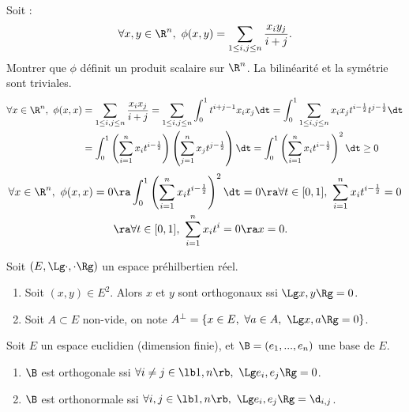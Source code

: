 \documentclass[11pt]{article}
\begin{document}
\begin{ex}{}{}
    Soit :
    \begin{equation*}
        \forall x,y \in \R^n, ~ \phi(x,y) = \sum_{1\leq i,j \leq n}\frac{x_i y_j}{i + j}.
    \end{equation*}
    Montrer que $\phi$ définit un produit scalaire sur $\R^n$.
    \tcblower
    La bilinéarité et la symétrie sont triviales.
    \begin{align*}
        \forall x \in \R^n, ~ \phi(x,x) &= \sum_{1\leq i,j \leq n}\frac{x_ix_j}{i+j}= \sum_{1\leq i,j \leq n} \int_0^1t^{i+j-1}x_ix_j\dt=\int_0^1 \sum_{1\leq i,j \leq n} x_i x_j t^{i-\frac{1}{2}}t^{j-\frac{1}{2}}\dt\\
        &=\int_0^1\left( \sum_{i=1}^n x_it^{i-\frac{1}{2}} \right)\left( \sum_{j=1}^nx_j t^{j-\frac{1}{2}} \right)\dt = \int_0^1 \left( \sum_{i=1}^n x_i t^{i-\frac{1}{2}} \right)^2\dt \geq 0
    \end{align*}
    \begin{align*}
        \forall x \in \R^n, ~ \phi(x,x) = 0 &\ra \int_0^1\left( \sum_{i=1}^n x_it^{i-\frac{1}{2}} \right)^2\dt=0 \ra \forall t \in [0,1], ~ \sum_{i=1}^n x_i t^{i-\frac{1}{2}}=0\\
    &\ra \forall t \in [0,1], ~ \sum_{i=1}^n x_it^i = 0 \ra x=0.
    \end{align*}
\end{ex}

\begin{defi}{}{}
    Soit $(E,\Lg \cdot, \cdot \Rg)$ un espace préhilbertien réel.
    \begin{enumerate}
        \item Soit $(x,y) \in E^2$. Alors $x$ et $y$ sont orthogonaux ssi $\Lg x,y \Rg = 0$.
        \item Soit $A\subset E$ non-vide, on note $A^\bot = \{x \in E, ~ \forall a \in A, ~ \Lg x, a \Rg = 0\}$.
    \end{enumerate}
\end{defi}

\vspace*{-0.8cm}

\begin{defi}{}{}
    Soit $E$ un espace euclidien (dimension finie), et $\B=(e_1,...,e_n)$ une base de $E$.
    \begin{enumerate}
        \item $\B$ est orthogonale ssi $\forall i\neq j \in \lb1,n\rb, ~ \Lg e_i, e_j \Rg = 0$.
        \item $\B$ est orthonormale ssi $\forall i, j \in \lb 1, n \rb, ~ \Lg e_i, e_j \Rg = \d_{i,j}$. 
    \end{enumerate}
\end{defi}
\end{document}
